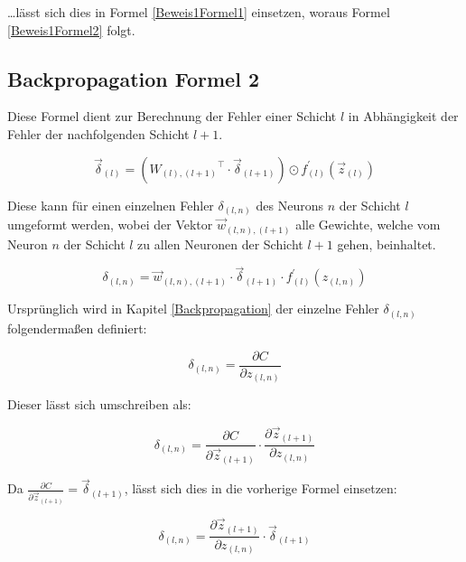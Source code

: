 \documentclass[
	a4paper,
	12pt,
	ngerman,
	oneside
]{scrreprt}											%
\begin{document}
				…lässt sich dies in Formel \ref{Beweis1Formel1} einsetzen, woraus Formel \ref{Beweis1Formel2} folgt.
				
	
	
			\subsection*{Backpropagation Formel 2}
				Diese Formel dient zur Berechnung der Fehler einer Schicht $l$ in Abhängigkeit der Fehler der nachfolgenden Schicht $l+1$.
				
				\begin{equation}
					\vec{\delta}_{(l)} = ({W_{(l),(l+1)}}^\intercal \cdot \vec{\delta}_{(l+1)}) \odot f_{(l)}^{\prime} (\vec{z}_{(l)})
				\end{equation}
			
				Diese kann für einen einzelnen Fehler $\delta_{(l,n)}$ des Neurons $n$ der Schicht $l$ umgeformt werden, wobei der Vektor $\vec{w}_{(l,n),(l+1)}$ alle Gewichte, welche vom Neuron $n$ der Schicht $l$ zu allen Neuronen der Schicht $l+1$ gehen, beinhaltet.
				
				\begin{equation}\label{Beweis2Formel2}
					\delta_{(l,n)} = \vec{w}_{(l,n),(l+1)} \cdot \vec{\delta}_{(l+1)} \cdot f_{(l)}^{\prime} (z_{(l,n)})
				\end{equation}
				
				Ursprünglich wird in Kapitel \ref{Backpropagation} der einzelne Fehler $\delta_{(l,n)}$ folgendermaßen definiert:
				
				\begin{equation}
					\delta_{(l,n)} = \frac{\partial C}{\partial z_{(l,n)}}
				\end{equation}
				
				Dieser lässt sich umschreiben als:
				
				\begin{equation}
					\delta_{(l,n)} = \frac{\partial C}{\partial \vec{z}_{(l+1)}} \cdot \frac{\partial \vec{z}_{(l+1)}}{\partial z_{(l,n)}}
				\end{equation}
				
				Da $\frac{\partial C}{\partial \vec{z}_{(l+1)}} = \vec{\delta}_{(l+1)}$, lässt sich dies in die vorherige Formel einsetzen:
				
				\begin{equation}\label{Beweis2Formel1}
					\delta_{(l,n)} = \frac{\partial \vec{z}_{(l+1)}}{\partial z_{(l,n)}} \cdot \vec{\delta}_{(l+1)}
				\end{equation}
				
\end{document}
